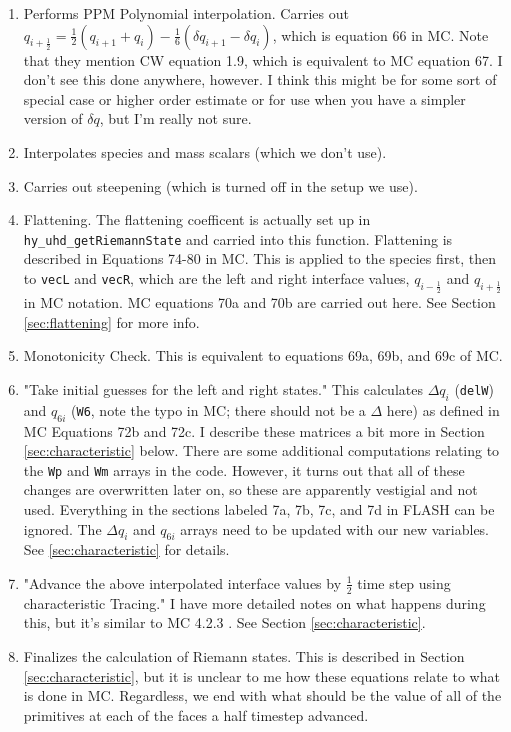 \documentclass[preprint,11pt]{aastex}
\begin{document}
\begin{description}
\begin{description}
\begin{itemize}
\begin{itemize}
\begin{enumerate}
					\item Performs PPM Polynomial interpolation.   Carries out $q_{i+\frac{1}{2}} = \frac{1}{2} \left( q_{i+1} + q_i \right) - \frac{1}{6} \left( \delta q_{i+1} - \delta q_i \right)$, which is equation 66 in MC.  Note that they mention CW equation 1.9, which is equivalent to MC equation 67.  I don't see this done anywhere, however.  I think this might be for some sort of special case or higher order estimate or for use when you have a simpler version of $\delta q$, but I'm really not sure.
					\item Interpolates species and mass scalars (which we don't use).
					\item Carries out steepening (which is turned off in the setup we use).
					\item Flattening.  The flattening coefficent is actually set up in \verb!hy_uhd_getRiemannState! and carried into this function.  Flattening is described in Equations 74-80 in MC.  This is applied to the species first, then to \verb!vecL! and \verb!vecR!, which are the left and right interface values, $q_{i-\frac{1}{2}}$ and $q_{i+\frac{1}{2}}$ in MC notation.  MC equations 70a and 70b are carried out here. See Section \ref{sec:flattening} for more info.
					\item Monotonicity Check.  This is equivalent to equations 69a, 69b, and 69c of MC.
					\item "Take initial guesses for the left and right states."  This calculates $\Delta q_i$ (\verb!delW!) and $q_{6i}$ (\verb!W6!, note the typo in MC; there should not be a $\Delta$ here) as defined in MC Equations 72b and 72c.  I describe these matrices a bit more in Section \ref{sec:characteristic} below.  There are some additional computations relating to the \verb!Wp! and \verb!Wm! arrays in the code.  However, it turns out that all of these changes are overwritten later on, so these are apparently vestigial and not used.  Everything in the sections labeled 7a, 7b, 7c, and 7d in FLASH can be ignored. {\color{red} The $\Delta q_i$ and $q_{6i}$ arrays need to be updated with our new variables.  See \ref{sec:characteristic} for details.}
					\item "Advance the above interpolated interface values by $\frac{1}{2}$ time step using characteristic Tracing."  I have more detailed notes on what happens during this, but it's similar to MC 4.2.3 .  See Section \ref{sec:characteristic}.
					\item Finalizes the calculation of Riemann states.  This is described in Section \ref{sec:characteristic}, but it is unclear to me how these equations relate to what is done in MC.  Regardless, we end with what should be the value of all of the primitives at each of the faces a half timestep advanced.

\end{enumerate}
\end{itemize}
\end{itemize}
\end{description}
\end{description}
\end{document}
